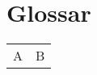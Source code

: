 \chapter*{Glossar}
\thispagestyle{plain}

\begin{table}[ht]
    \begin{tabularx}{\textwidth}{lX}
A & B
     \end{tabularx}
    \label{tab:my_label1}
\end{table}



